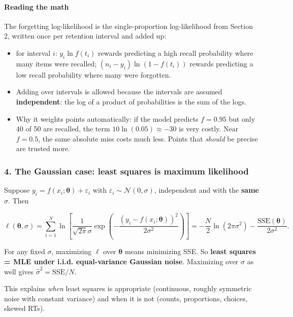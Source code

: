 \paragraph{Reading the math}

The forgetting log-likelihood is the single-proportion log-likelihood
from Section 2, written once per retention interval and added up:

\begin{itemize}
\tightlist
\item
  for interval \(i\): \(y_i \ln f(t_i)\) rewards predicting a high
  recall probability where many items were recalled;
  \((n_i - y_i)\ln(1 - f(t_i))\) rewards predicting a low recall
  probability where many were forgotten.
\item
  Adding over intervals is allowed because the intervals are assumed
  \textbf{independent}: the log of a product of probabilities is the sum
  of the logs.
\item
  Why it weights points automatically: if the model predicts
  \(f = 0.95\) but only 40 of 50 are recalled, the term
  \(10 \ln(0.05) \approx -30\) is very costly. Near \(f = 0.5\), the
  same absolute miss costs much less. Points that \emph{should} be
  precise are trusted more.
\end{itemize}

\subsubsection{4. The Gaussian case: least squares is maximum
likelihood}

Suppose \(y_i = f(x_i;\boldsymbol\theta) + \varepsilon_i\) with
\(\varepsilon_i \sim \mathcal{N}(0, \sigma)\), independent and with the
\textbf{same} \(\sigma\). Then

\[
\ell(\boldsymbol\theta, \sigma) = \sum_{i=1}^{N}\ln\left[\frac{1}{\sqrt{2\pi}\sigma}\exp\left(-\frac{(y_i - f(x_i;\boldsymbol\theta))^2}{2\sigma^2}\right)\right]
= -\frac{N}{2}\ln(2\pi\sigma^2) - \frac{\mathrm{SSE}(\boldsymbol\theta)}{2\sigma^2}.
\]

For any fixed \(\sigma\), maximizing \(\ell\) over \(\boldsymbol\theta\)
means minimizing SSE. So \textbf{least squares = MLE under i.i.d.
equal-variance Gaussian noise}. Maximizing over \(\sigma\) as well gives
\(\hat\sigma^2 = \mathrm{SSE}/N\).

This explains \emph{when} least squares is appropriate (continuous,
roughly symmetric noise with constant variance) and when it is not
(counts, proportions, choices, skewed RTs).

